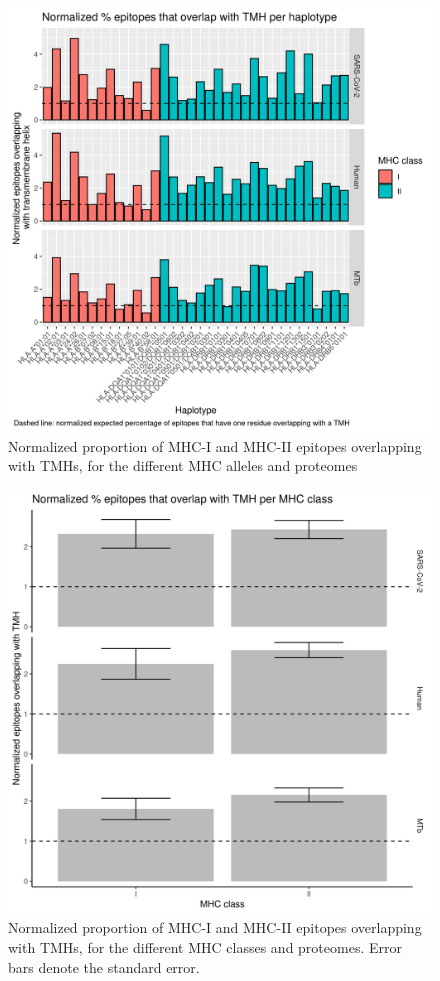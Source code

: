 \begin{figure}[!htbp]
  \includegraphics[width=\textwidth]{bbbq_1_smart_results/fig_rel_presentation_per_haplotype.png}
  \caption{
    Normalized proportion of MHC-I and MHC-II epitopes overlapping with TMHs,
    for the different MHC alleles and proteomes
  }
  \label{fig:rel_presentation_per_haplotype}
\end{figure}

\begin{figure}[!htbp]
  \includegraphics[width=\textwidth]{bbbq_1_smart_results/fig_rel_presentation.png}
  \caption{
    Normalized proportion of MHC-I and MHC-II epitopes overlapping with TMHs,
    for the different MHC classes and proteomes. Error bars denote the
    standard error.
  }
  \label{fig:rel_presentation}
\end{figure}

